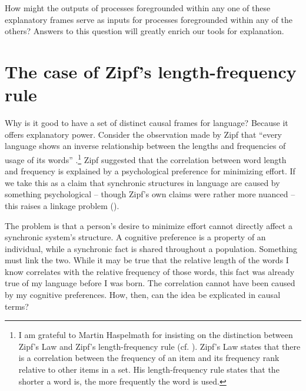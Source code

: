 How might the outputs of processes foregrounded within any one of these 
explanatory frames serve as inputs for processes foregrounded within any 
of the others? Answers to this question will greatly enrich our tools for 
explanation.



\section{The case of Zipf's length-frequency rule}
\label{zipflengthrule}
Why is it good to have a set of distinct causal frames for language?
Because it offers explanatory power. Consider the observation made by Zipf that ``every language shows an inverse relationship between the lengths 
and frequencies of usage of its words'' \citep[66]{zipf_human_1949}.\footnote{I am grateful to Martin Haspelmath for insisting on the distinction between Zipf's Law and Zipf's length-frequency rule (cf. \citealt{NewmanPowerLaws2006}). Zipf's Law states that there is a correlation between the frequency of an item and its frequency rank relative to other items in a set. His length-frequency rule states that the shorter a word is, the more frequently the word is used.} Zipf suggested that the correlation between word length and frequency is explained by a psychological preference for minimizing 
effort. If we take this as a claim that synchronic structures in 
language are caused by something psychological -- though Zipf's own claims 
were rather more nuanced -- this raises a linkage problem (\citealt[201]{clark_psychological_1984}). 



The problem is that a person's desire to minimize effort cannot directly affect a synchronic system's structure. 
A cognitive preference is a property of an individual, while a synchronic 
fact is shared throughout a population. Something must link the two. 
While it may be true that the relative length of the words I know 
correlates with the relative frequency of those words, this fact was 
already true of my language before I was born. The correlation cannot have been caused by my cognitive 
preferences. How, then, can the idea be explicated in causal terms?



